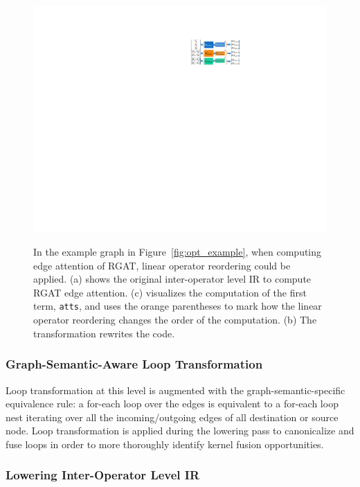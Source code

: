 \begin{figure}[!htbp]
[\linewidth]{\includegraphics[scale=1.8]{figures/Hector/supplemental_linear_opt.final.3.pdf}}
\caption{\label{fig:linear_opt} In the example graph in Figure~\ref{fig:opt_example}, when computing edge attention of RGAT, linear operator reordering could be applied. (a) shows the original inter-operator level IR to compute RGAT edge attention. (c) visualizes the computation of the first term, \texttt{atts}, and uses the orange parentheses to mark how the linear operator reordering changes the order of the computation. (b) The transformation rewrites the code.}
\end{figure}





\subsubsection{Graph-Semantic-Aware Loop Transformation}\label{sec:graph_aware_loop}
Loop transformation at this level is augmented with the graph-semantic-specific equivalence rule: a for-each loop over the edges is equivalent to a for-each loop nest iterating over all the incoming/outgoing edges of all destination or source node. Loop transformation is applied during the lowering pass to canonicalize and fuse loops in order to more thoroughly identify kernel fusion opportunities. 


\subsubsection{Lowering Inter-Operator Level IR}

